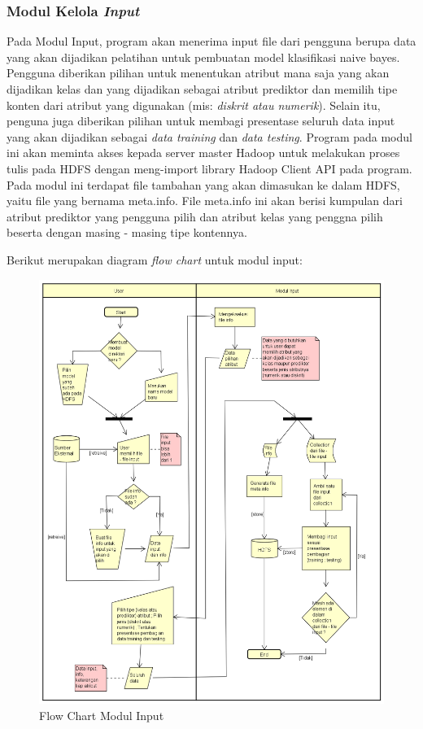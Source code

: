\subsubsection{Modul Kelola \textit{Input}}

Pada Modul Input, program akan menerima input file dari pengguna berupa data yang akan dijadikan pelatihan untuk pembuatan model klasifikasi naive bayes. Pengguna diberikan pilihan untuk menentukan atribut mana saja yang akan dijadikan kelas dan yang dijadikan sebagai atribut prediktor dan memilih tipe konten dari atribut yang digunakan (mis: \textit{diskrit atau numerik}). Selain itu, penguna juga diberikan pilihan untuk membagi presentase seluruh data input yang akan dijadikan sebagai \textit{data training} dan \textit{data testing}. Program pada modul ini akan meminta akses kepada server master Hadoop untuk melakukan proses tulis pada HDFS dengan meng-import library Hadoop Client API pada program. Pada modul ini terdapat file tambahan yang akan dimasukan ke dalam HDFS, yaitu file yang bernama meta.info. File meta.info ini akan berisi kumpulan dari atribut prediktor yang pengguna pilih dan atribut kelas yang penggna pilih beserta dengan masing - masing tipe kontennya.

Berikut merupakan diagram \textit{flow chart} untuk modul input:

\begin{figure}[H]
	\centering
	\label{fig:flow_input}
	\includegraphics[scale=0.55]{Diagram/Flowchart_Input}
	\caption[Flow Chart Modul Input]{Flow Chart Modul Input}
	\label{fig:Flow Chart Modul Input}
\end{figure}

